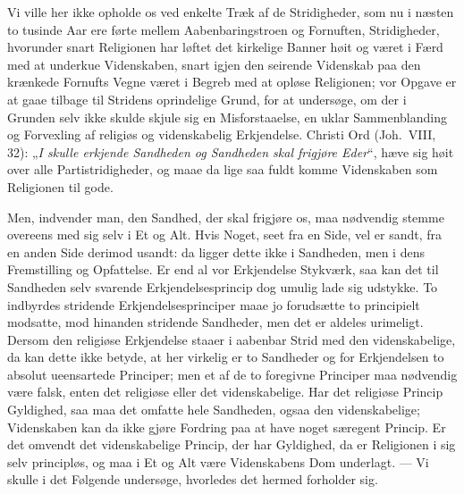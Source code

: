\documentclass[12pt,a4paper]{article}
\newcommand{\opage}[1]{\marginnote{\footnotesize\textit{[#1]}}}
\begin{document}
Vi ville her ikke opholde os ved enkelte Træk af de Stridigheder, som
nu i næsten to tusinde Aar ere førte mellem Aabenbaringstroen og
Fornuften, Stridigheder, hvorunder snart Religionen har løftet det
kirkelige Banner høit og været i Færd med at underkue Videnskaben,
snart igjen den seirende Videnskab paa den krænkede Fornufts Vegne
været i Begreb med at opløse Religionen; vor Opgave er at gaae tilbage
til Stridens oprindelige Grund, for at undersøge, om der i Grunden
selv ikke skulde skjule sig en Misforstaaelse, en uklar Sammenblanding
og Forvexling af religiøs og videnskabelig Erkjendelse. Christi Ord
(Joh.\ VIII, 32): „\emph{I skulle erkjende Sandheden og Sandheden skal
frigjøre Eder}“, hæve sig høit over alle Partistridigheder, og maae da
lige saa fuldt komme Videnskaben som Religionen til gode.

Men, indvender man, den Sandhed, der skal frigjøre os, maa nødvendig
stemme overeens med sig selv i Et og Alt. Hvis Noget, seet fra en
Side, vel er sandt, fra en anden Side derimod usandt: da ligger dette
ikke i Sandheden, men i dens Fremstilling og Opfattelse. Er end al vor
Erkjendelse Stykværk, saa kan det til Sandheden selv svarende
Erkjendelsesprincip dog umulig lade sig udstykke. To indbyrdes
stridende Erkjendelsesprinciper maae jo forudsætte to principielt
modsatte, mod hinanden stridende Sandheder, men det er aldeles
urimeligt. Dersom den religiøse Erkjendelse staaer i aabenbar Strid
med den videnskabelige, da kan dette ikke betyde, at her virkelig er
to Sandheder og for Erkjendelsen to absolut ueensartede Principer; men
et af de to \opage{4} foregivne Principer maa nødvendig være falsk, enten det
religiøse eller det videnskabelige. Har det religiøse Princip Gyldighed,
saa maa det omfatte hele Sandheden, ogsaa den videnskabelige; Videnskaben
kan da ikke gjøre Fordring paa at have noget særegent Princip. Er det
omvendt det videnskabelige Princip, der har Gyldighed, da er Religionen
i sig selv principløs, og maa i Et og Alt være Videnskabens Dom
underlagt. --- Vi skulle i det Følgende undersøge, hvorledes det hermed
forholder sig.
\end{document}

